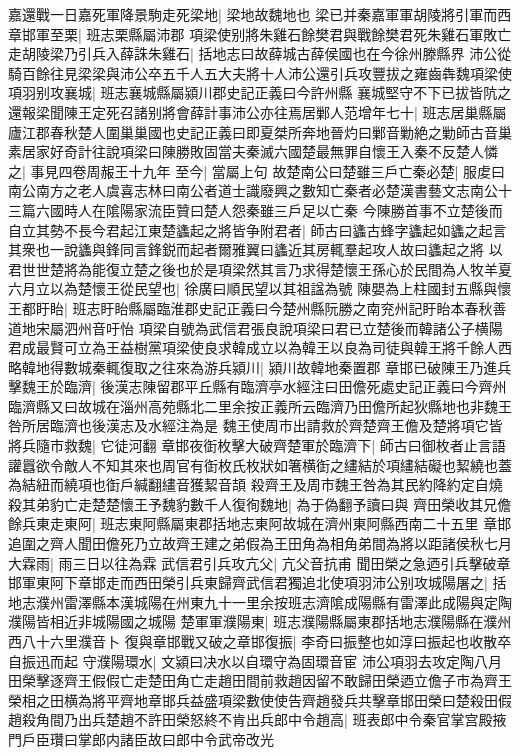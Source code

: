 嘉還戰一日嘉死軍降景駒走死梁地|{
	梁地故魏地也}
梁已并秦嘉軍軍胡陵將引軍而西章邯軍至栗|{
	班志栗縣屬沛郡}
項梁使别將朱雞石餘樊君與戰餘樊君死朱雞石軍敗亡走胡陵梁乃引兵入薛誅朱雞石|{
	括地志曰故薛城古薛侯國也在今徐州滕縣界}
沛公從騎百餘往見梁梁與沛公卒五千人五大夫將十人沛公還引兵攻豐拔之雍齒犇魏項梁使項羽别攻襄城|{
	班志襄城縣屬潁川郡史記正義曰今許州縣}
襄城堅守不下已拔皆阬之還報梁聞陳王定死召諸别將會薛計事沛公亦往焉居鄛人范增年七十|{
	班志居巢縣屬廬江郡春秋楚人圍巢巢國也史記正義曰即夏桀所奔地晉灼曰鄛音勦絶之勦師古音巢}
素居家好奇計往說項梁曰陳勝敗固當夫秦滅六國楚最無罪自懷王入秦不反楚人憐之|{
	事見四卷周赧王十九年}
至今|{
	當屬上句}
故楚南公曰楚雖三戶亡秦必楚|{
	服䖍曰南公南方之老人虞喜志林曰南公者道士識廢興之數知亡秦者必楚漢書藝文志南公十三篇六國時人在隂陽家流臣贊曰楚人怨秦雖三戶足以亡秦}
今陳勝首事不立楚後而自立其勢不長今君起江東楚蠭起之將皆争附君者|{
	師古曰蠭古蜂字蠭起如蠭之起言其衆也一說蠭與鋒同言鋒鋭而起者爾雅翼曰蠭近其房輒羣起攻人故曰蠭起之將}
以君世世楚將為能復立楚之後也於是項梁然其言乃求得楚懷王孫心於民間為人牧羊夏六月立以為楚懷王從民望也|{
	徐廣曰順民望以其祖諡為號}
陳嬰為上柱國封五縣與懷王都盱眙|{
	班志盱眙縣屬臨淮郡史記正義曰今楚州縣阮勝之南兖州記盱眙本春秋善道地宋屬泗州音吁怡}
項梁自號為武信君張良說項梁曰君已立楚後而韓諸公子横陽君成最賢可立為王益樹黨項梁使良求韓成立以為韓王以良為司徒與韓王將千餘人西略韓地得數城秦輒復取之往來為游兵潁川|{
	潁川故韓地秦置郡}
章邯已破陳王乃進兵擊魏王於臨濟|{
	後漢志陳留郡平丘縣有臨濟亭水經注曰田儋死處史記正義曰今齊州臨濟縣又曰故城在淄州高苑縣北二里余按正義所云臨濟乃田儋所起狄縣地也非魏王咎所居臨濟也後漢志及水經注為是}
魏王使周市出請救於齊楚齊王儋及楚將項它皆將兵隨市救魏|{
	它徒河翻}
章邯夜衘枚擊大破齊楚軍於臨濟下|{
	師古曰御枚者止言語讙囂欲令敵人不知其來也周官有衘枚氏枚狀如箸横衘之繣結於項繣結礙也絜繞也蓋為結紐而繞項也衘戶緘翻繣音獲絜音頡}
殺齊王及周市魏王咎為其民約降約定自燒殺其弟豹亡走楚楚懷王予魏豹數千人復徇魏地|{
	為于偽翻予讀曰與}
齊田榮收其兄儋餘兵東走東阿|{
	班志東阿縣屬東郡括地志東阿故城在濟州東阿縣西南二十五里}
章邯追圍之齊人聞田儋死乃立故齊王建之弟假為王田角為相角弟間為將以距諸侯秋七月大霖雨|{
	雨三日以往為霖}
武信君引兵攻亢父|{
	亢父音抗甫}
聞田榮之急迺引兵擊破章邯軍東阿下章邯走而西田榮引兵東歸齊武信君獨追北使項羽沛公别攻城陽屠之|{
	括地志濮州雷澤縣本漢城陽在州東九十一里余按班志濟隂成陽縣有雷澤此成陽與定陶濮陽皆相近非城陽國之城陽}
楚軍軍濮陽東|{
	班志濮陽縣屬東郡括地志濮陽縣在濮州西八十六里濮音卜}
復與章邯戰又破之章邯復振|{
	李奇曰振整也如淳曰振起也收散卒自振迅而起}
守濮陽環水|{
	文潁曰决水以自環守為固環音宦}
沛公項羽去攻定陶八月田榮擊逐齊王假假亡走楚田角亡走趙田間前救趙因留不敢歸田榮迺立儋子市為齊王榮相之田横為將平齊地章邯兵益盛項梁數使使告齊趙發兵共擊章邯田榮曰楚殺田假趙殺角間乃出兵楚趙不許田榮怒終不肯出兵郎中令趙高|{
	班表郎中令秦官掌宫殿掖門戶臣瓚曰掌郎内諸臣故曰郎中令武帝改光}


